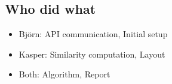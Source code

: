\documentclass[]{article}
\begin{document}
\subsection{Who did what}
\begin{itemize}
\item Björn: API communication, Initial setup
\item Kasper: Similarity computation, Layout 
\item Both: Algorithm, Report
\end{itemize}



\end{document}
